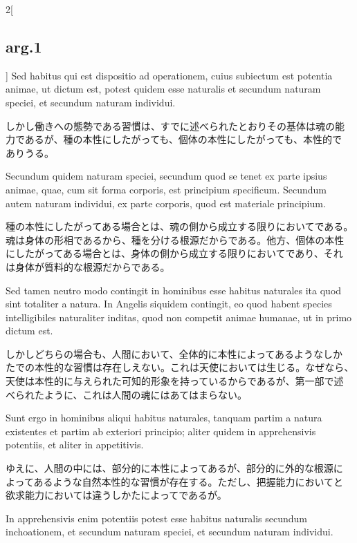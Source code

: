 \documentclass[paper=a4paper,fontsize=10pt,jafontsize=9pt,titlepage]{jlreq}
\begin{document}
\begin{paracol}{2}[\subsection{arg.1}]
Sed habitus qui est dispositio ad operationem, cuius subiectum est
potentia animae, ut dictum est, potest quidem esse naturalis et
secundum naturam speciei, et secundum naturam individui.

\switchcolumn

しかし働きへの態勢である習慣は、すでに述べられたとおりその基体は魂の能
力であるが、種の本性にしたがっても、個体の本性にしたがっても、本性的で
ありうる。

\switchcolumn*

Secundum quidem naturam speciei, secundum quod se tenet ex parte
ipsius animae, quae, cum sit forma corporis, est principium
specificum. Secundum autem naturam individui, ex parte corporis, quod
est materiale principium.

\switchcolumn

種の本性にしたがってある場合とは、魂の側から成立する限りにおいてである。
魂は身体の形相であるから、種を分ける根源だからである。他方、個体の本性
にしたがってある場合とは、身体の側から成立する限りにおいてであり、それ
は身体が質料的な根源だからである。

\switchcolumn*

Sed tamen neutro modo contingit in hominibus esse habitus naturales
ita quod sint totaliter a natura. In Angelis siquidem contingit, eo
quod habent species intelligibiles naturaliter inditas, quod non
competit animae humanae, ut in primo dictum est.

\switchcolumn

しかしどちらの場合も、人間において、全体的に本性によってあるようなしか
たでの本性的な習慣は存在しえない。これは天使においては生じる。なぜなら、
天使は本性的に与えられた可知的形象を持っているからであるが、第一部で述
べられたように、これは人間の魂にはあてはまらない。

\switchcolumn*

Sunt ergo in hominibus aliqui habitus naturales, tanquam partim a
natura existentes et partim ab exteriori principio; aliter quidem in
apprehensivis potentiis, et aliter in appetitivis.

\switchcolumn

ゆえに、人間の中には、部分的に本性によってあるが、部分的に外的な根源に
よってあるような自然本性的な習慣が存在する。ただし、把握能力においてと
欲求能力においては違うしかたによってであるが。

\switchcolumn*

In apprehensivis enim potentiis potest esse habitus naturalis secundum
inchoationem, et secundum naturam speciei, et secundum naturam
individui.


\end{paracol}
\end{document}
